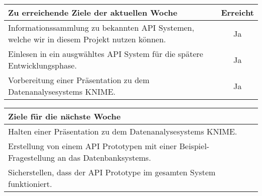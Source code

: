 \begin{tabularx}{\textwidth}{Xc}
    \arrayrulecolor{OliveGreen}
    \toprule
    {\bfseries Zu erreichende Ziele der aktuellen Woche} & {\bfseries Erreicht} \\
    \midrule[2pt]
    Informationssammlung zu bekannten API Systemen, welche wir in diesem Projekt nutzen können.                  &Ja                    \\
    \rowcolor{OliveGreen!15}
    Einlesen in ein ausgwähltes API System für die spätere Entwicklungsphase. &Ja                    \\
    \rowcolor{White}
    Vorbereitung einer Präsentation zu dem Datenanalysesystems KNIME. &Ja \\
    \bottomrule[2pt]
\end{tabularx}
%
\vspace{1cm}
%
\begin{tabularx}{\textwidth}{Xc}
    \arrayrulecolor{OliveGreen}
    \toprule
    {\bfseries Ziele für die nächste Woche}              &                      \\
    \midrule[2pt]
    Halten einer Präsentation zu dem Datenanalysesystems KNIME.                               &                      \\
    \rowcolor{OliveGreen!15}
    Erstellung von einem API Prototypen mit einer Beispiel-Fragestellung an das Datenbanksystems.                              &                      \\
    \rowcolor{White}
    Sicherstellen, dass der API Prototype im gesamten System funktioniert.  & \\
\end{tabularx}
